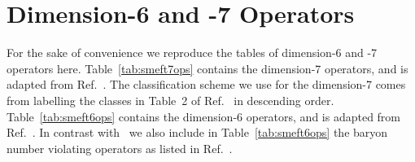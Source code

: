 \section{Dimension-6 and -7 Operators}
\label{sec:app}

For the sake of convenience we reproduce the tables of dimension-6 and -7 operators here.
Table~\ref{tab:smeft7ops} contains the dimension-7 operators, and is adapted from Ref.~\cite{Liao:2016hru}.
The classification scheme we use for the dimension-7 comes from labelling the classes in Table~2 of Ref.~\cite{Henning:2015alf} in descending order.
Table~\ref{tab:smeft6ops} contains the dimension-6 operators, and is adapted from Ref.~\cite{Alonso:2013hga}.
In contrast with~\cite{Alonso:2013hga} we also include in Table~\ref{tab:smeft6ops} the baryon number violating operators as listed in Ref.~\cite{Alonso:2014zka}.



